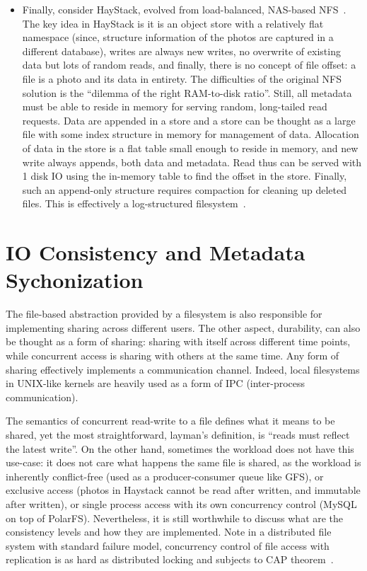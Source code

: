\begin{itemize}
    \item Finally, consider HayStack, evolved from load-balanced, NAS-based
    NFS~\cite{beaver2010finding}. The key idea in HayStack is it is an object
    store with a relatively flat namespace (since, structure information of
    the photos are captured in a different database), writes are always new
    writes, no overwrite of existing data but lots of random reads, and
    finally, there is no concept of file offset: a file is a photo and its
    data in entirety. The difficulties of the original NFS solution is the
    ``dilemma of the right RAM-to-disk ratio''. Still, all metadata must be
    able to reside in memory for serving random, long-tailed read requests.
    Data are appended in a store and a store can be thought as a large file
    with some index structure in memory for management of data. Allocation of
    data in the store is a flat table small enough to reside in memory, and
    new write always appends, both data and metadata. Read thus can be served
    with 1 disk IO using the in-memory table to find the offset in the store.
    Finally, such an append-only structure requires compaction for cleaning
    up deleted files. This is effectively a log-structured
    filesystem~\cite{rosenblum1992design}.
\end{itemize}

\section{IO Consistency and Metadata Sychonization}
The file-based abstraction provided by a filesystem is also responsible for
implementing sharing across different users. The other aspect, durability,
can also be thought as a form of sharing: sharing with itself across
different time points, while concurrent access is sharing with others at the
same time. Any form of sharing effectively implements a communication
channel. Indeed, local filesystems in UNIX-like kernels are heavily used as a
form of IPC (inter-process communication).

The semantics of concurrent read-write to a file defines what it means to be
shared, yet the most straightforward, layman's definition, is ``reads must
reflect the latest write''. On the other hand, sometimes the workload does
not have this use-case: it does not care what happens the same file is
shared, as the workload is inherently conflict-free (used as a
producer-consumer queue like GFS), or exclusive access (photos in Haystack
cannot be read after written, and immutable after written), or single process
access with its own concurrency control (MySQL on top of PolarFS).
Nevertheless, it is still worthwhile to discuss what are the consistency
levels and how they are implemented. Note in a distributed file system with
standard failure model, concurrency control of file access with replication
is as hard as distributed locking and subjects to CAP
theorem~\cite{gilbert2002brewer}.

